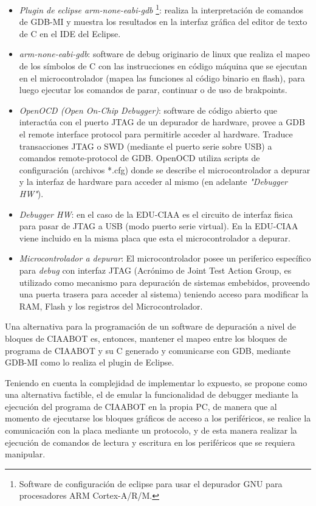 \begin{itemize}
	\item \emph{Plugin de eclipse arm-none-eabi-gdb}
	\footnote{Software de configuración de eclipse para usar el depurador GNU para procesadores ARM Cortex-A/R/M.}: realiza la interpretación de comandos de	GDB-MI y muestra los resultados en la interfaz gráfica del editor de texto de C en el IDE del Eclipse.
	\item \emph{arm-none-eabi-gdb}: software de debug originario de linux que realiza el mapeo de los símbolos de C con las instrucciones en código máquina que se ejecutan en el microcontrolador (mapea las funciones al código binario en flash), para
	luego ejecutar los comandos de parar, continuar o de uso de brakpoints.
	\item \emph{OpenOCD (Open On-Chip Debugger)}: software de código abierto que interactúa con el puerto JTAG de un depurador de hardware, provee a GDB el remote interface protocol para permitirle acceder al hardware. Traduce transacciones JTAG o SWD (mediante el puerto serie sobre USB) a comandos remote-protocol de GDB. OpenOCD utiliza scripts de configuración (archivos *.cfg) donde se describe el microcontrolador a depurar y la interfaz de hardware para acceder al mismo (en adelante \emph{"Debugger HW"}).
	\item \emph{Debugger HW}: en el caso de la EDU-CIAA es el circuito de interfaz fisica para pasar de JTAG a USB (modo puerto serie virtual). En la EDU-CIAA
	viene incluido en la misma placa que esta el microcontrolador a depurar.
	\item \emph{Microcontrolador a depurar}: El microcontrolador posee un periferico específico para \emph{debug} con interfaz JTAG (Acrónimo de Joint Test Action Group, es utilizado como mecanismo para depuración de sistemas embebidos, proveendo una puerta trasera para acceder al sistema) teniendo acceso para modificar la RAM, Flash y los registros del Microcontrolador.
\end{itemize}

Una alternativa para la programación de un software de depuración a nivel de bloques de CIAABOT es, entonces, mantener el mapeo entre los bloques de programa de CIAABOT y su C generado y comunicarse con GDB, mediante GDB-MI como lo realiza el plugin de Eclipse.

Teniendo en cuenta la complejidad de implementar lo expuesto, se propone como una alternativa factible, el de emular la funcionalidad de debugger mediante la ejecución del programa de CIAABOT en la propia PC, de manera que al momento de ejecutarse los bloques gráficos de acceso a los periféricos, se realice la comunicación con la placa mediante un protocolo, y de esta manera realizar la ejecución de comandos de lectura y escritura en los periféricos que se requiera manipular.

